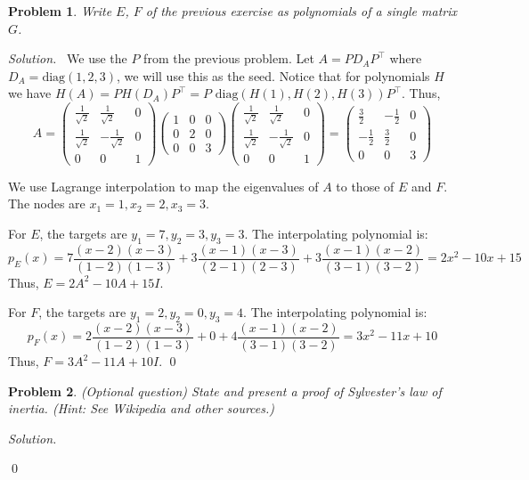 \documentclass[12pt,a4paper]{article}
\newenvironment{solution}{%
  \par\noindent\textit{Solution.}\ }{\qed}
\theoremstyle{problemstyle}
\newtheorem{problem}{Problem}[section]
\begin{document}
\begin{problem}\label{prob:5-10}
Write $E$, $F$ of the previous exercise as polynomials of a single matrix $G$.
\end{problem}
\begin{solution}
	We use the $P$ from the previous problem. Let \( A = P D_A P^\top \) where \( D_A = \text{diag}(1, 2, 3) \), we will use this as the seed. 
	Notice that for polynomials $H$ we have $H(A)=P H(D_A)P^\top=P\text{ diag}(H(1),H(2),H(3))P^\top$. Thus,
\[ A = \begin{pmatrix} \frac{1}{\sqrt{2}} & \frac{1}{\sqrt{2}} & 0 \\ \frac{1}{\sqrt{2}} & -\frac{1}{\sqrt{2}} & 0 \\ 0 & 0 & 1 \end{pmatrix} \begin{pmatrix} 1 & 0 & 0 \\ 0 & 2 & 0 \\ 0 & 0 & 3 \end{pmatrix} \begin{pmatrix} \frac{1}{\sqrt{2}} & \frac{1}{\sqrt{2}} & 0 \\ \frac{1}{\sqrt{2}} & -\frac{1}{\sqrt{2}} & 0 \\ 0 & 0 & 1 \end{pmatrix} = \begin{pmatrix} \frac{3}{2} & -\frac{1}{2} & 0 \\ -\frac{1}{2} & \frac{3}{2} & 0 \\ 0 & 0 & 3 \end{pmatrix} \]

We use Lagrange interpolation to map the eigenvalues of \( A \) to those of \( E \) and \( F \). The nodes are \( x_1=1, x_2=2, x_3=3 \).

For \( E \), the targets are \( y_1=7, y_2=3, y_3=3 \). The interpolating polynomial is:
\[ p_E(x) = 7\frac{(x-2)(x-3)}{(1-2)(1-3)} + 3\frac{(x-1)(x-3)}{(2-1)(2-3)} + 3\frac{(x-1)(x-2)}{(3-1)(3-2)} = 2x^2 - 10x + 15 \]
Thus, \( E = 2A^2 - 10A + 15I \).

For \( F \), the targets are \( y_1=2, y_2=0, y_3=4 \). The interpolating polynomial is:
\[ p_F(x) = 2\frac{(x-2)(x-3)}{(1-2)(1-3)} + 0 + 4\frac{(x-1)(x-2)}{(3-1)(3-2)} = 3x^2 - 11x + 10 \]
Thus, \( F = 3A^2 - 11A + 10I \).
\end{solution}

\begin{problem}\label{prob:5-11}
(Optional question) State and present a proof of Sylvester's law of inertia. (Hint: See Wikipedia and other sources.)
\end{problem}
\begin{solution}

\end{solution}
\end{document}
